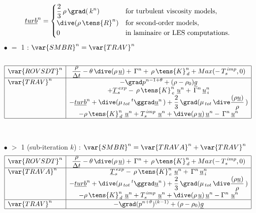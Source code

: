\begin{equation}\notag
\underline{turb}^{n}=
\begin{cases}
\displaystyle\frac {2}{3}\,\rho\,\grad (\,k^{n}) &
\text{for turbulent viscosity models}, \\
\dive(\rho\,\tens{R}^n) & \text{for second-order models},\\
0 & \text{in laminaire or LES computations.}\\
\end{cases}
\end{equation}
$\bullet$  $=$ 1 : $\var{SMBR}^n=\var{TRAV}^n$
\\\\
\begin{equation}\label{Base_Predvv_tab_exp0}
\begin{array}{|l|c|}
\hline
\var{ROVSDT}^{n} &
\displaystyle \frac{\rho}{\Delta t} -\theta \,\dive (\rho\,\underline {u}) +\, \Gamma^n + \, \rho\,\tens{K}_{\,d}^n+Max(-\,T_s^{\,imp},0)\\
\hline
\var{TRAV}^{n}
& \displaystyle
- \grad p^{n-1+\theta} + (\rho -\rho_0) \underline {g} \\
& \displaystyle
+ \underline{T}_{s}^{\,exp}-\,\rho\,\tens{K}_{\,e}^{n}\ \underline{u}^{n} + \,\Gamma^{n}\,\underline{u}_{\,i}^{n}\\
& \displaystyle
-\underline{turb}^{n}+ \dive (\mu_{\,tot}\,^t\ggrad \underline {u}^{n}\,)+ \frac {2} {3}\,\grad (\mu_{\,tot}\,\dive \frac{(\rho \underline {u})}{\rho}\,)\\
& \displaystyle
-\rho\,\tens{K}_{\,d}^n\ \underline{u}^{n}+ T_s^{\,imp}\,\,\underline {u}^{n} + \dive (\rho\,\underline {u})\,\underline{u}^{n} - \,\Gamma^{n}\,\underline{u}^{n}\\
\hline
\end{array}
\end{equation}
\\\\
$\bullet$  $>$ 1 (sub-iteration $k$) : $\var{SMBR}^n=\var{TRAVA}^n+\var{TRAV}^n$
\begin{equation}\label{Base_Predvv_tab_exp1}
\begin{array}{|l|c|}
\hline
\var{ROVSDT}^{n} &
\displaystyle \frac{\rho}{\Delta t} -\theta \,\dive (\rho\,\underline {u}) +\, \Gamma^n + \, \rho\,\tens{K}_{\,d}^n+Max(-\,T_s^{\,imp},0)\\
\hline
\var{TRAVA}^{n} &
\displaystyle
\underline{T}_{s}^{\,exp}-\,\rho\,\tens{K}_{\,e}^{n}\ \underline{u}^{n} + \,\Gamma^{n}\,\underline{u}_{\,i}^{n}\\
& \displaystyle
-\underline{turb}^{n}+ \dive (\mu_{\,tot}\,^t\ggrad \underline {u}^{n}\,)+ \frac {2} {3}\,\grad (\mu_{\,tot}\,\dive \frac{(\rho \underline {u})}{\rho}\,)\\
& \displaystyle
-\rho\,\tens{K}_{\,d}^n\ \underline{u}^{n}+ T_s^{\,imp}\,\,\underline {u}^{n} + \dive (\rho\,\underline {u})\,\underline{u}^{n} - \Gamma^n\,\,\underline{u}^{n}\\
\hline
\var{TRAV}^{n} &
\displaystyle
- \grad (p^{n+\theta})^{(k-1)} + (\rho -\rho_0) \underline {g} \\
\hline
\end{array}
\end{equation}

